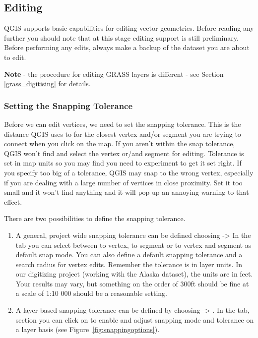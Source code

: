 \subsection{Editing}

QGIS supports basic capabilities for editing vector geometries.  Before reading any
further you should note that at this stage editing support is still preliminary.
Before performing any edits, always make a backup of the dataset you are about
to edit. 

\textbf{Note} - the procedure for editing GRASS layers is different - see
Section \ref{grass_digitising} for details.

\subsubsection{Setting the Snapping Tolerance}

Before we can edit vertices, we need to set the snapping tolerance. This is the 
distance QGIS uses to  for the closest vertex and/or segment you 
are trying to connect when you click on the map. If you aren't within the snap tolerance,
QGIS won't find and select the vertex or/and segment for editing. Tolerance is set in map
units so you may find you need to experiment to get it set right. If you
specify too big of a tolerance, QGIS may snap to the wrong vertex, especially if you are 
dealing with a large number of vertices in close proximity. Set it too small and it won't 
find anything and it will pop up an annoying warning to that effect. 

There are two possibilities to define the snapping tolerance. 

\begin{enumerate}
\item A general, project wide snapping tolerance can be defined choosing  ->  
In the  tab you can select between to vertex, to segment or to vertex and segment 
as default snap mode. You can also define a default snapping tolerance and a search radius for 
vertex edits. Remember the tolerance is in layer units. In our digitizing project 
(working with the Alaska dataset), the units are in feet. Your results may vary, 
but something on the order of 300ft should be fine at a scale of 1:10 000 
should be a reasonable setting.
\item A layer based snapping tolerance can be defined by choosing  -> 
. In the  tab, section 
 you can click on  to enable and adjust snapping 
mode and tolerance on a layer basis (see Figure~\ref{fig:snappingoptions}).
\end{enumerate}

